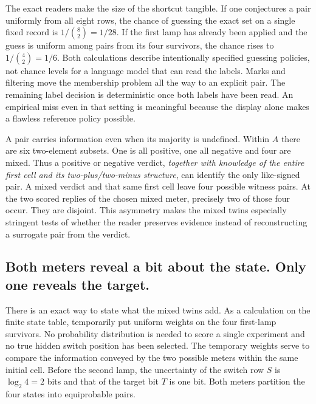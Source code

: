 \documentclass[12pt,letterpaper]{article}
\begin{document}
The exact readers make the size of the shortcut tangible. If one conjectures a pair uniformly from all eight rows, the chance of guessing the exact set on a single fixed record is $1/\binom82=1/28$. If the first lamp has already been applied and the guess is uniform among pairs from its four survivors, the chance rises to $1/\binom42=1/6$. Both calculations describe intentionally specified guessing policies, not chance levels for a language model that can read the labels. Marks and filtering move the membership problem all the way to an explicit pair. The remaining label decision is deterministic once both labels have been read. An empirical miss even in that setting is meaningful because the display alone makes a flawless reference policy possible.

A pair carries information even when its majority is undefined. Within $A$ there are six two-element subsets. One is all positive, one all negative and four are mixed. Thus a positive or negative verdict, \emph{together with knowledge of the entire first cell and its two-plus/two-minus structure}, can identify the only like-signed pair. A mixed verdict and that same first cell leave four possible witness pairs. At the two scored replies of the chosen mixed meter, precisely two of those four occur. They are disjoint. This asymmetry makes the mixed twins especially stringent tests of whether the reader preserves evidence instead of reconstructing a surrogate pair from the verdict.

\subsection{Both meters reveal a bit about the state. Only one reveals the target.}

There is an exact way to state what the mixed twins add. As a calculation on the finite state table, temporarily put uniform weights on the four first-lamp survivors. No probability distribution is needed to score a single experiment and no true hidden switch position has been selected. The temporary weights serve to compare the information conveyed by the two possible meters within the same initial cell. Before the second lamp, the uncertainty of the switch row $S$ is $\log_2 4=2$ bits and that of the target bit $T$ is one bit. Both meters partition the four states into equiprobable pairs.
\end{document}
